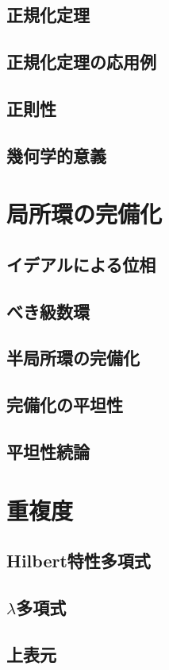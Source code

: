 \documentclass[uplatex]{jsarticle}
\theoremstyle{definition}
\begin{document}
\subsection{正規化定理}
\subsection{正規化定理の応用例}
\subsection{正則性}
\subsection{幾何学的意義}

\section{局所環の完備化}
\subsection{イデアルによる位相}
\subsection{べき級数環}
\subsection{半局所環の完備化}
\subsection{完備化の平坦性}
\subsection{平坦性続論}

\section{重複度}

\subsection{Hilbert特性多項式}
\subsection{\(\lambda\)多項式}
\subsection{上表元}
\end{document}

